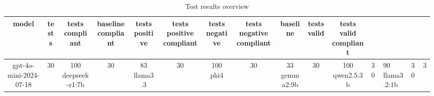 
  \begin{table}[h!]
  \centering
  \begin{tabular}{|c|c|c|c|c|c|c|c|c|c|c|}
  \hline
  model & tests & tests compliant & baseline compliant & tests positive & tests positive compliant & tests negative & tests negative compliant & baseline & tests valid & tests valid compliant \\
  \hline
  gpt-4o-mini-2024-07-18 & 30 & 100%
\hline
deepseek-r1:7b & 30 & 83%
\hline
llama3.3 & 30 & 100%
\hline
phi4 & 30 & 33%
\hline
gemma2:9b & 30 & 100%
\hline
qwen2.5:3b & 30 & 90%
\hline
llama3.2:1b & 30 & 3%
  \end{tabular}
  \caption{Test results overview}
  
  \end{table}
  